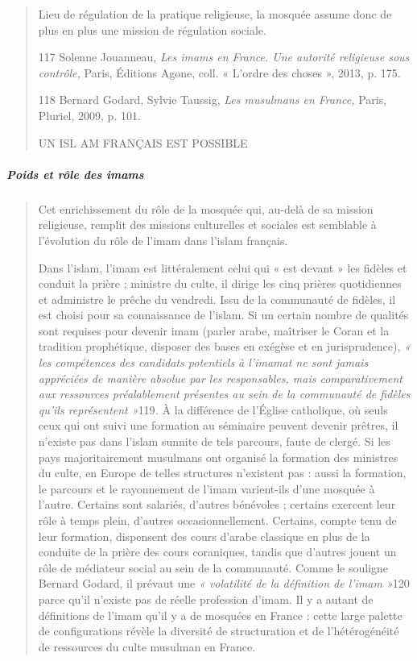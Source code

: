 \begin{quote}
Lieu de régulation de la pratique religieuse, la mosquée assume donc de
plus en plus une mission de régulation sociale.

117 Solenne Jouanneau, \emph{Les imams en France. Une autorité
religieuse sous contrôle,} Paris, Éditions Agone, coll. « L'ordre des
choses », 2013, p. 175.

118 Bernard Godard, Sylvie Taussig, \emph{Les musulmans en France,}
Paris, Pluriel, 2009, p. 101.

UN ISL AM FRANÇAIS EST POSSIBLE
\end{quote}

\hypertarget{poids-et-ruxf4le-des-imams}{%
\subparagraph{Poids et rôle des
imams}\label{poids-et-ruxf4le-des-imams}}

\begin{quote}
Cet enrichissement du rôle de la mosquée qui, au-delà de sa mission
religieuse, remplit des missions culturelles et sociales est semblable à
l'évolution du rôle de l'imam dans l'islam français.

Dans l'islam, l'imam est littéralement celui qui « est devant » les
fidèles et conduit la prière ; ministre du culte, il dirige les cinq
prières quotidiennes et administre le prêche du vendredi. Issu de la
communauté de fidèles, il est choisi pour sa connaissance de l'islam. Si
un certain nombre de qualités sont requises pour devenir imam (parler
arabe, maîtriser le Coran et la tradition prophétique, disposer des
bases en exégèse et en jurisprudence), \emph{« les compétences des
candidats potentiels à l'imamat ne sont jamais appréciées de manière
absolue par les responsables, mais comparativement aux ressources
préalablement présentes au sein de la communauté de fidèles qu'ils
représentent »}119\emph{.} À la différence de l'Église catholique, où
seuls ceux qui ont suivi une formation au séminaire peuvent devenir
prêtres, il n'existe pas dans l'islam sunnite de tels parcours, faute de
clergé. Si les pays majoritairement musulmans ont organisé la formation
des ministres du culte, en Europe de telles structures n'existent pas :
aussi la formation, le parcours et le rayonnement de l'imam varient-ils
d'une mosquée à l'autre. Certains sont salariés, d'autres bénévoles ;
certains exercent leur rôle à temps plein, d'autres occasionnellement.
Certains, compte tenu de leur formation, dispensent des cours d'arabe
classique en plus de la conduite de la prière des cours coraniques,
tandis que d'autres jouent un rôle de médiateur social au sein de la
communauté. Comme le souligne Bernard Godard, il prévaut une \emph{«
volatilité de la définition de l'imam »}120 parce qu'il n'existe pas de
réelle profession d'imam. Il y a autant de définitions de l'imam qu'il y
a de mosquées en France : cette large palette de configurations révèle
la diversité de structuration et de l'hétérogénéité de ressources du
culte musulman en France.


\end{quote}
